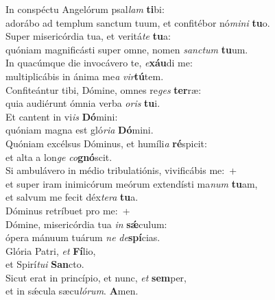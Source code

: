 \evenverse In conspéctu Angelórum psal\textit{lam} \textbf{ti}bi:~\*\\
\evenverse adorábo ad templum sanctum tuum, et confitébor nó\textit{mi}\textit{ni} \textbf{tu}o.\\
\oddverse Super misericórdia tua, et veritá\textit{te} \textbf{tu}a:~\*\\
\oddverse quóniam magnificásti super omne, nomen \textit{san}\textit{ctum} \textbf{tu}um.\\
\evenverse In quacúmque die invocávero te, \textit{e}\textbf{xáu}di me:~\*\\
\evenverse multiplicábis in ánima me\textit{a} \textit{vir}\textbf{tú}tem.\\
\oddverse Confiteántur tibi, Dómine, omnes re\textit{ges} \textbf{ter}ræ:~\*\\
\oddverse quia audiérunt ómnia verba \textit{o}\textit{ris} \textbf{tu}i.\\
\evenverse Et cantent in vi\textit{is} \textbf{Dó}mini:~\*\\
\evenverse quóniam magna est gló\textit{ri}\textit{a} \textbf{Dó}mini.\\
\oddverse Quóniam excélsus Dóminus, et humíli\textit{a} \textbf{ré}spicit:~\*\\
\oddverse et alta a lon\textit{ge} \textit{co}\textbf{gnó}scit.\\
\evenverse Si ambulávero in médio tribulatiónis, vivificábis me:~+\\
\evenverse  et super iram inimicórum meórum extendísti ma\textit{num} \textbf{tu}am,~\*\\
\evenverse et salvum me fecit déx\textit{te}\textit{ra} \textbf{tu}a.\\
\oddverse Dóminus retríbuet pro me:~+\\
\oddverse  Dómine, misericórdia tua \textit{in} \textbf{sǽ}culum:~\*\\
\oddverse ópera mánuum tuárum \textit{ne} \textit{de}\textbf{spí}cias.\\
\evenverse Glória Patri, \textit{et} \textbf{Fí}lio,~\*\\
\evenverse et Spirí\textit{tu}\textit{i} \textbf{San}cto.\\
\oddverse Sicut erat in princípio, et nunc, \textit{et} \textbf{sem}per,~\*\\
\oddverse et in sǽcula sæcu\textit{ló}\textit{rum}. \textbf{A}men.\\
